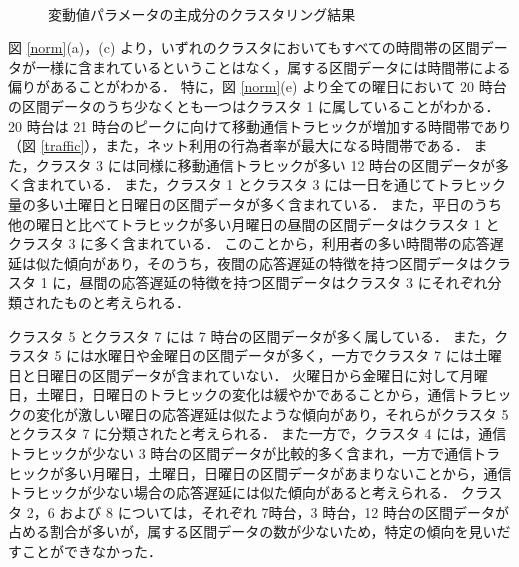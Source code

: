 \documentclass[technicalreport]{ieicej}
\begin{document}
\begin{figure}[tb]
\begin{center}
{}\\
\caption{変動値パラメータの主成分のクラスタリング結果}
\label{diff}
\end{center}
\end{figure}

図 \ref{norm}(a)，(c) より，いずれのクラスタにおいてもすべての時間帯の区間データが一様に含まれているということはなく，属する区間データには時間帯による偏りがあることがわかる．
特に，図 \ref{norm}(e) より全ての曜日において 20 時台の区間データのうち少なくとも一つはクラスタ 1 に属していることがわかる．
20 時台は 21 時台のピークに向けて移動通信トラヒックが増加する時間帯であり（図 \ref{traffic}）\cite{soumutrafficstatics}，また，ネット利用の行為者率が最大になる時間帯である\cite{soumuwhitepaper}．
また，クラスタ 3 には同様に移動通信トラヒックが多い 12 時台の区間データが多く含まれている．
また，クラスタ 1 とクラスタ 3 には一日を通じてトラヒック量の多い土曜日と日曜日の区間データが多く含まれている．
また，平日のうち他の曜日と比べてトラヒックが多い月曜日の昼間の区間データはクラスタ 1 とクラスタ 3 に多く含まれている．
このことから，利用者の多い時間帯の応答遅延は似た傾向があり，そのうち，夜間の応答遅延の特徴を持つ区間データはクラスタ 1 に，昼間の応答遅延の特徴を持つ区間データはクラスタ 3 にそれぞれ分類されたものと考えられる．

クラスタ 5 とクラスタ 7 には 7 時台の区間データが多く属している．
また，クラスタ 5 には水曜日や金曜日の区間データが多く，一方でクラスタ 7 には土曜日と日曜日の区間データが含まれていない．
火曜日から金曜日に対して月曜日，土曜日，日曜日のトラヒックの変化は緩やかであることから，通信トラヒックの変化が激しい曜日の応答遅延は似たような傾向があり，それらがクラスタ 5 とクラスタ 7 に分類されたと考えられる．
また一方で，クラスタ 4 には，通信トラヒックが少ない 3 時台の区間データが比較的多く含まれ，一方で通信トラヒックが多い月曜日，土曜日，日曜日の区間データがあまりないことから，通信トラヒックが少ない場合の応答遅延には似た傾向があると考えられる．
クラスタ 2，6 および 8 については，それぞれ 7時台，3 時台，12 時台の区間データが占める割合が多いが，属する区間データの数が少ないため，特定の傾向を見いだすことができなかった．
\end{document}
